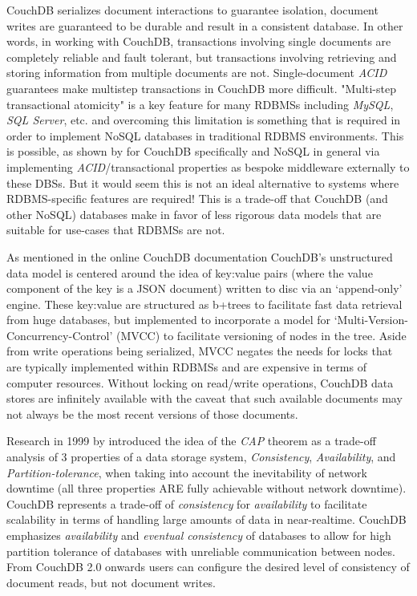 CouchDB serializes document interactions to guarantee isolation, document writes are guaranteed to be durable and result in a consistent database. In other words, in working with CouchDB, transactions involving single documents are completely reliable and fault tolerant, but transactions involving retrieving and storing information from multiple documents are not. Single-document \textit{ACID} guarantees make multistep transactions in CouchDB more difficult. "Multi-step transactional atomicity" is a key feature for many RDBMSs including \textit{MySQL}, \textit{SQL Server}, etc. and overcoming this limitation is something that is required in order to implement NoSQL databases in traditional RDBMS environments. This is possible, as shown by \cite{Rashmi2017} for CouchDB specifically and NoSQL in general \cite{LOTFY2016133} via implementing \textit{ACID}/transactional properties as bespoke middleware externally to these DBSs. But it would seem this is not an ideal alternative to systems where RDBMS-specific features are required! This is a trade-off that CouchDB (and other NoSQL) databases make in favor of less rigorous data models that are suitable for use-cases that RDBMSs are not.

As mentioned in the online CouchDB documentation \cite{couchguide} CouchDB's unstructured data model is centered around the idea of key:value pairs (where the value component of the key is a JSON document) written to disc via an `append-only' engine. These key:value are structured as b+trees to facilitate fast data retrieval from huge databases, but implemented to incorporate a model for `Multi-Version-Concurrency-Control' (MVCC) to facilitate versioning of nodes in the tree. Aside from write operations being serialized, MVCC negates the needs for locks that are typically implemented within RDBMSs and are expensive in terms of computer resources. Without locking on read/write operations, CouchDB data stores are infinitely available with the caveat that such available documents may not always be the most recent versions of those documents.

Research in 1999 by \cite{cap} introduced the idea of the \textit{CAP} theorem as a trade-off analysis of 3 properties of a data storage system, \textit{Consistency}, \textit{Availability}, and \textit{Partition-tolerance}, when taking into account the inevitability of network downtime (all three properties ARE fully achievable without network downtime). CouchDB represents a trade-off of \textit{consistency} for \textit{availability} to facilitate scalability in terms of handling large amounts of data in near-realtime. CouchDB emphasizes \textit{availability} and \textit{eventual consistency} of databases to allow for high partition tolerance of databases with unreliable communication between nodes. From CouchDB 2.0 onwards users can configure the desired level of consistency of document reads, but not document writes.

